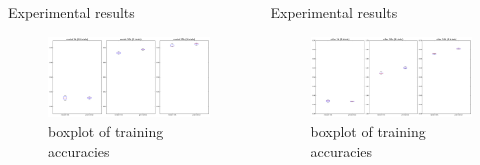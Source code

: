 \documentclass[final]{beamer}
\newlength{\onecolwid}
\newlength{\threecolwid}
\begin{document}
\begin{frame}[t]
\begin{columns}[t]
\begin{column}{\threecolwid}
\begin{columns}[t, totalwidth=\threecolwid]
\begin{column}{\onecolwid} %
\begin{block}{Experimental results}

\begin{figure}
\includegraphics[width=\linewidth]{box_plots/boxplots_mnist.png}
\caption{boxplot of training accuracies}
\end{figure}

\end{block}
\end{column}
\begin{column}{\onecolwid}
\begin{block}{Experimental results}

\begin{figure}
\includegraphics[width=\linewidth]{box_plots/boxplots_cifar.png}
\caption{boxplot of training accuracies}
\end{figure}

\begin{figure}
\centering


\end{figure}
\end{block}
\end{column}
\end{columns}
\end{column}
\end{columns}
\end{frame}
\end{document}
